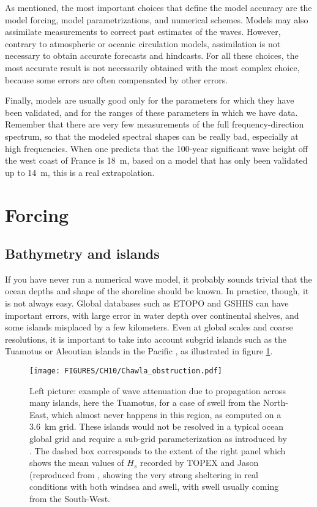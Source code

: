 As mentioned, the most important choices that define the model accuracy are the model forcing, model parametrizations, and numerical schemes. 
 Models may also assimilate measurements to correct past estimates of the waves. However, contrary to atmospheric or oceanic circulation models, 
 assimilation is not necessary to obtain accurate forecasts and hindcasts. 
For all these choices, the most accurate result is not necessarily obtained with the most complex choice, because some errors are often 
compensated by other errors. 

Finally, models are usually good only for the parameters for which they have been validated, and for the ranges of these parameters in which we have data. 
Remember that there are very few measurements of the full frequency-direction 
spectrum, so that the modeled spectral shapes can be really bad, especially at high frequencies. When one predicts that the 100-year significant wave height 
off the west coast of France is 18~m, based on a model that has only been validated up to 14~m, this is a real extrapolation. 


\section{Forcing}
\subsection{Bathymetry and islands}
If you have never run a numerical wave model, it probably sounds trivial that the ocean depths and shape of the shoreline should be known. In practice, 
though, it is not always easy. Global databases such as ETOPO \citep{Sloss1993} and GSHHS \citep{Wessel&Smith1996} can have important errors, with large 
error in water depth over continental shelves, and some islands
misplaced by a few kilometers. Even at global scales and coarse resolutions, it is important to take into account subgrid islands such as the Tuamotus or Aleoutian 
islands in the Pacific \citep{Tolman2003}, as illustrated in figure \ref{fig_obstruction}.

\begin{figure}
\centerline{\texttt{[image: FIGURES/CH10/Chawla\_obstruction.pdf]}}
\caption{Left picture: example of wave attenuation due to propagation across many islands, here the Tuamotus, for a case of swell from the 
North-East, which almost never happens in this region, as computed on a 3.6~km grid. These islands  
would not be resolved in a typical ocean global grid \citep[reproduced from][]{Chawla&Tolman2008} and require a sub-grid parameterization as 
introduced by \cite{Tolman2003}. The dashed box corresponds to the extent of the right panel 
which shows the mean values of $H_s$ recorded by TOPEX and Jason (reproduced from \cite{Andrefouet&al.2012}, showing the very strong sheltering in 
real conditions with both windsea and swell, with swell usually coming from the South-West.}
\label{fig_obstruction}
\end{figure}

